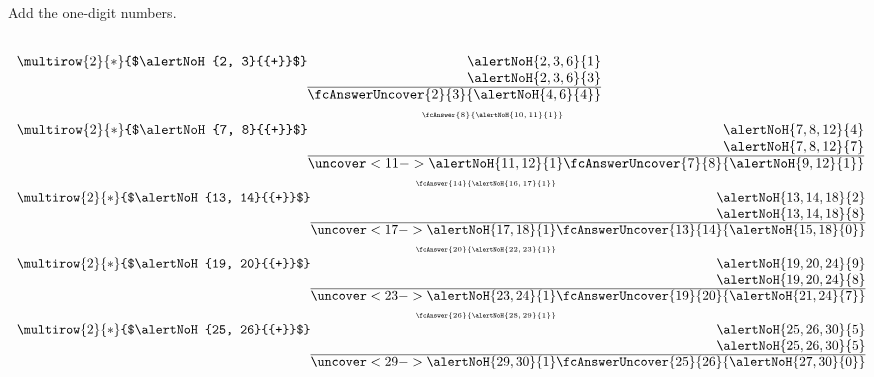 \begin{frame}

\vskip -0.1cm

\begin{example}Add the one-digit numbers.

$\begin{array}{r@{}r@{}}
&\\ 
\multirow{2}{*}{$\alertNoH{2, 3}{{+}}$} &\alertNoH{2, 3, 6}{{1}}\\&\alertNoH{2, 3, 6}{{3}}\\\cline{2-2} &\fcAnswerUncover{2}{3}{{\alertNoH{4, 6}{{4}}}}\end{array} $\hfil$\begin{array}{r@{}r@{}r@{}}
&\text{\tiny{$ \fcAnswer{8}{{\alertNoH{10, 11}{{1}}}}$}}&\\ 
\multirow{2}{*}{$\alertNoH{7, 8}{{+}}$} &&\alertNoH{7, 8, 12}{{4}}\\&&\alertNoH{7, 8, 12}{{7}}\\\cline{2-3} &\uncover<11->{\alertNoH{11, 12}{{1}}}&\fcAnswerUncover{7}{8}{{\alertNoH{9, 12}{{1}}}}\end{array} $\hfil$\begin{array}{r@{}r@{}r@{}}
&\text{\tiny{$ \fcAnswer{14}{{\alertNoH{16, 17}{{1}}}}$}}&\\ 
\multirow{2}{*}{$\alertNoH{13, 14}{{+}}$} &&\alertNoH{13, 14, 18}{{2}}\\&&\alertNoH{13, 14, 18}{{8}}\\\cline{2-3} &\uncover<17->{\alertNoH{17, 18}{{1}}}&\fcAnswerUncover{13}{14}{{\alertNoH{15, 18}{{0}}}}\end{array} $\hfil$\begin{array}{r@{}r@{}r@{}}
&\text{\tiny{$ \fcAnswer{20}{{\alertNoH{22, 23}{{1}}}}$}}&\\ 
\multirow{2}{*}{$\alertNoH{19, 20}{{+}}$} &&\alertNoH{19, 20, 24}{{9}}\\&&\alertNoH{19, 20, 24}{{8}}\\\cline{2-3} &\uncover<23->{\alertNoH{23, 24}{{1}}}&\fcAnswerUncover{19}{20}{{\alertNoH{21, 24}{{7}}}}\end{array} $\hfil$\begin{array}{r@{}r@{}r@{}}
&\text{\tiny{$ \fcAnswer{26}{{\alertNoH{28, 29}{{1}}}}$}}&\\ 
\multirow{2}{*}{$\alertNoH{25, 26}{{+}}$} &&\alertNoH{25, 26, 30}{{5}}\\&&\alertNoH{25, 26, 30}{{5}}\\\cline{2-3} &\uncover<29->{\alertNoH{29, 30}{{1}}}&\fcAnswerUncover{25}{26}{{\alertNoH{27, 30}{{0}}}}\end{array} $\hfil


\end{example}
\end{frame}
